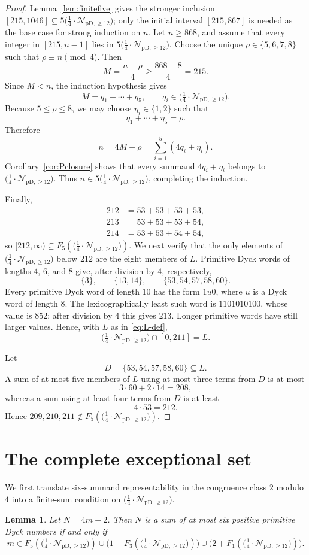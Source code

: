 \documentclass[12pt]{article}
\theoremstyle{plain}
\newtheorem{lemma}[theorem]{Lemma}
\theoremstyle{definition}
\theoremstyle{plain}
\newcommand{\Pset}{%
  \bigl(\tfrac{1}{4}\cdot\mathcal{N}_{\mathrm{pD},\geq 12}\bigr)%
}
\begin{document}
\begin{proof}
Lemma~\ref{lem:finitefive} gives the stronger inclusion
$[215,1046]\subseteq5\Pset$; only the initial interval $[215,867]$ is
needed as the base case for strong induction on $n$.  Let $n\geq868$, and
assume that every integer in $[215,n-1]$ lies in $5\Pset$.  Choose the
unique $\rho\in\{5,6,7,8\}$ such that
$\rho\equiv n\pmod4$.  Then
\[
 M=\frac{n-\rho}{4}\geq\frac{868-8}{4}=215.
\]
Since $M<n$, the induction hypothesis gives
\[
 M=q_1+\cdots+q_5,\qquad q_i\in\Pset.
\]
Because $5\leq\rho\leq8$, we may choose $\eta_i\in\{1,2\}$ such that
\[
 \eta_1+\cdots+\eta_5=\rho.
\]
Therefore
\[
 n=4M+\rho=\sum_{i=1}^{5}(4q_i+\eta_i).
\]
Corollary~\ref{cor:Pclosure} shows that every summand $4q_i+\eta_i$ belongs
to $\Pset$.  Thus $n\in5\Pset$, completing the induction.

Finally,
\[
\begin{aligned}
212&=53+53+53+53,\\
213&=53+53+53+54,\\
214&=53+53+54+54,
\end{aligned}
\]
so $[212,\infty)\subseteq F_5(\Pset)$.  We next verify that the only elements of $\Pset$ below $212$ are the
eight members of $L$.  Primitive Dyck words of lengths $4$, $6$, and $8$
give, after division by $4$, respectively,
\[
 \{3\},\qquad \{13,14\},\qquad \{53,54,57,58,60\}.
\]
Every primitive Dyck word of length $10$ has the form $1u0$, where $u$
is a Dyck word of length $8$.  The lexicographically least such word is
$1101010100$, whose value is $852$; after division by $4$ this gives
$213$.  Longer primitive words have still larger values.  Hence, with $L$ as
in \eqref{eq:L-def},
\[
 \Pset\cap[0,211]=L.
\]

Let
\[
 D=\{53,54,57,58,60\}\subseteq L.
\]
A sum of at most five members of $L$ using at most three terms from $D$
is at most
\[
 3\cdot60+2\cdot14=208,
\]
whereas a sum using at least four terms from $D$ is at least
\[
 4\cdot53=212.
\]
Hence $209,210,211\notin F_5(\Pset)$.
\end{proof}

\section{The complete exceptional set}\label{sec:exceptions}

We first translate six-summand representability in the congruence class
$2$ modulo $4$ into a finite-sum condition on $\Pset$.

\begin{lemma}\label{lem:sixcriterion}
Let $N=4m+2$.  Then $N$ is a sum of at most six positive primitive Dyck
numbers if and only if
\[
 m\in F_5(\Pset)
 \cup\bigl(1+F_3(\Pset)\bigr)
 \cup\bigl(2+F_1(\Pset)\bigr).
\]
\end{lemma}
\end{document}
